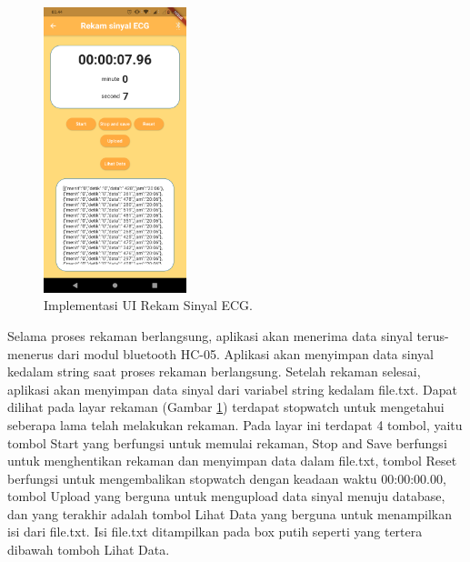 \begin{figure}[H] \centering
	\includegraphics[width=0.37\textwidth]{img/layar_rekaman.png}
	\caption{Implementasi UI Rekam Sinyal ECG.}
	\label{fig:3.5}
\end{figure}


Selama proses rekaman berlangsung, aplikasi akan menerima data sinyal terus-menerus dari modul bluetooth HC-05. Aplikasi akan menyimpan data sinyal kedalam string saat proses rekaman berlangsung. Setelah rekaman selesai, aplikasi akan menyimpan data sinyal dari variabel string kedalam file.txt. Dapat dilihat pada layar rekaman (Gambar \ref{fig:3.5}) terdapat stopwatch untuk mengetahui seberapa lama telah melakukan rekaman. Pada layar ini terdapat 4 tombol, yaitu tombol Start yang berfungsi untuk memulai rekaman, Stop and Save berfungsi untuk menghentikan rekaman dan menyimpan data dalam file.txt, tombol Reset berfungsi untuk mengembalikan stopwatch dengan keadaan waktu 00:00:00.00, tombol Upload yang berguna untuk mengupload data sinyal menuju database, dan yang terakhir adalah tombol Lihat Data yang berguna untuk menampilkan isi dari file.txt. Isi file.txt ditampilkan pada box putih seperti yang tertera dibawah tomboh Lihat Data.

\vspace{1ex} 

